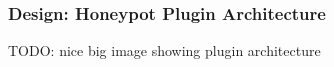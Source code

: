 \begin{frame}
\frametitle{Design: Honeypot Plugin Architecture}

TODO: nice big image showing plugin architecture

\end{frame}

